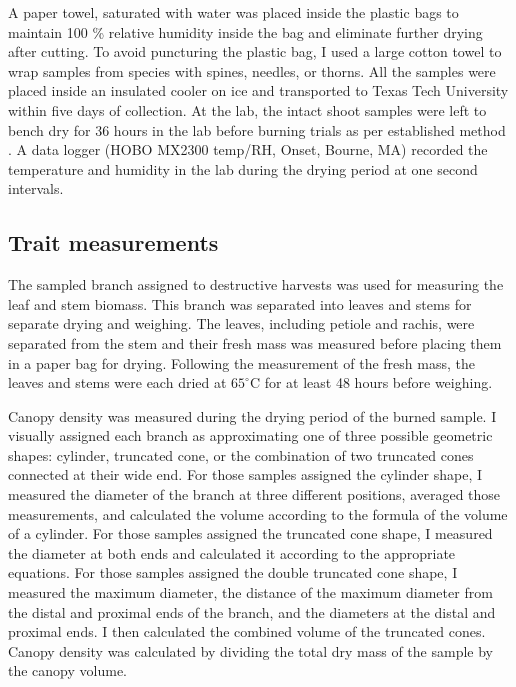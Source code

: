 \documentclass{ttuthes2007}
\begin{document}
A paper towel, saturated with water was placed inside the plastic bags to maintain 100 \% relative humidity inside the bag and eliminate further drying after cutting. To avoid puncturing the plastic bag, I used a large cotton towel to wrap samples from species with spines, needles, or thorns. All the samples were placed inside an insulated cooler on ice and transported to Texas Tech University within five days of collection.  %
At the lab, the intact shoot samples were left to bench dry for 36 hours in the lab before burning trials  as per established method \citep{wyse2016quantitative}. %
A data logger (HOBO MX2300 temp/RH, Onset, Bourne, MA) recorded the temperature and humidity in the lab during the drying period at one second intervals.



\subsection{Trait measurements}
The sampled branch assigned to destructive harvests was used for measuring the leaf and stem biomass.
This branch was separated into leaves and stems for separate drying and weighing. The leaves, including petiole and rachis, were separated from the stem and their fresh mass was measured before placing them in a paper bag for drying. Following the measurement of the fresh mass, the leaves and stems were each dried at $65^{\circ}$C for at least 48 hours before weighing.

Canopy density was measured during the drying period of the burned sample. I visually assigned each branch as approximating one of three possible geometric shapes: cylinder, truncated cone, or the combination of two truncated cones connected at their wide end. For those samples assigned the cylinder shape, I measured the diameter of the branch at three different positions, averaged those measurements, and calculated the volume according to the formula of the volume of a cylinder. For those samples assigned the truncated cone shape, I measured the diameter at both ends and calculated it according to the appropriate equations. For those samples assigned the double truncated cone shape, I measured the maximum diameter, the distance of the maximum diameter from the distal and proximal ends of the branch, and the diameters at the distal and proximal ends. I then calculated the combined volume of the truncated cones. Canopy density was calculated by dividing the total dry mass of the sample by the canopy volume.
\end{document}
